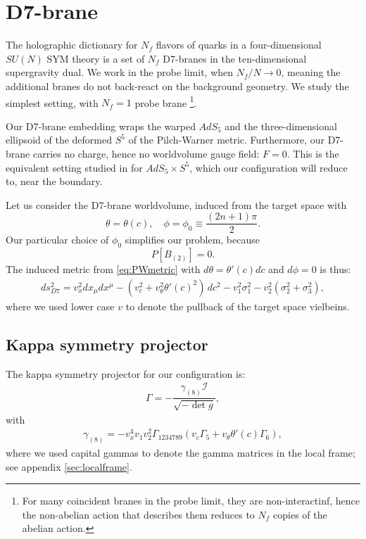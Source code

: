 \section{D7-brane}\label{sec:D7brane}

The holographic dictionary for $N_f$ flavors of quarks in a four-dimensional $SU(N)$ SYM theory is a set of $N_f$ D7-branes in the ten-dimensional supergravity dual. We work in the probe limit, when $N_f/N \rightarrow 0$, meaning the additional branes do not back-react on the background geometry. We study the simplest setting, with $N_f=1$ probe brane \footnote{For many coincident branes in the probe limit, they are non-interactinf, hence the non-abelian action that describes them reduces to $N_f$ copies of the abelian action.}.

Our D7-brane embedding wraps the warped $AdS_5$ and the three-dimensional ellipsoid of the deformed $S^5$ of the Pilch-Warner metric. Furthermore, our D7-brane carries no charge, hence no worldvolume gauge field: $F = 0$. This is the equivalent setting studied in \cite{Karch:2002sh} for $AdS_5 \times S^5$, which our configuration will reduce to, near the boundary.


Let us consider the D7-brane worldvolume, induced from the target space with 
\begin{equation}\label{eq:ansatz}
 \theta = \theta(c), \quad \phi=\phi_0\equiv\frac{(2 n + 1)\pi}{2}.
\end{equation}
Our particular choice of $\phi_0$ simplifies our problem, because
\begin{equation}
 P[B_{(2)}] = 0.
\end{equation}
The induced metric from \eqref{eq:PWmetric} with $d\theta = \theta'(c) dc$ and $d\phi=0$ is thus:
\begin{align}\label{eq:D7metric}
ds_{D7}^2 =
v_x^2 dx_\mu dx^\mu 
- (v_c^2 +v_\theta^2 \theta'(c)^2)\, dc^2 - v_1^2 \sigma_1^2 - v_2^2 (\sigma_2^2 + \sigma_3^2),
\end{align}
where we used lower case $v$ to denote the pullback of the target space vielbeins.



\subsection{Kappa symmetry projector}

The kappa symmetry projector for our configuration is:
\begin{align}
\Gamma = - \dfrac{ \gamma_{(8)} \mathcal{I} }{\sqrt{-\det g}},
\end{align}
with
\begin{align}
 \gamma_{(8)} = - v_x^4 v_1 v_2^2 \Gamma_{1 2 3 4 7 8 9}( v_c \Gamma_5 +  v_{\theta} \theta'(c) \Gamma_6), 
\end{align}
where we used capital gammas to denote the gamma matrices in the local frame; see appendix \ref{sec:localframe}.

